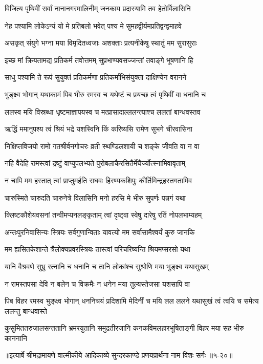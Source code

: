 \twolineshloka
{विजित्य पृथिवीं सर्वां नानानगरमालिनीम्}
{जनकाय प्रदास्यामि तव हेतोर्विलासिनि} %

\twolineshloka
{नेह पश्यामि लोकेऽन्यं यो मे प्रतिबलो भवेत्}
{पश्य मे सुमहद्वीर्यमप्रतिद्वन्द्वमाहवे} %

\twolineshloka
{असकृत् संयुगे भग्ना मया विमृदितध्वजाः}
{अशक्ताः प्रत्यनीकेषु स्थातुं मम सुरासुराः} %

\twolineshloka
{इच्छ मां क्रियतामद्य प्रतिकर्म तवोत्तमम्}
{सुप्रभाण्यवसज्जन्तां तवाङ्गे भूषणानि हि} %

\twolineshloka
{साधु पश्यामि ते रूपं सुयुक्तं प्रतिकर्मणा}
{प्रतिकर्माभिसंयुक्ता दाक्षिण्येन वरानने} %

\twolineshloka
{भुङ्क्ष्व भोगान् यथाकामं पिब भीरु रमस्व च}
{यथेष्टं च प्रयच्छ त्वं पृथिवीं वा धनानि च} %

\twolineshloka
{ललस्व मयि विस्रब्धा धृष्टमाज्ञापयस्व च}
{मत्प्रासादाल्ललन्त्याश्च ललतां बान्धवस्तव} %

\twolineshloka
{ऋद्धिं ममानुपश्य त्वं श्रियं भद्रे यशस्विनि}
{किं करिष्यसि रामेण सुभगे चीरवासिना} %

\twolineshloka
{निक्षिप्तविजयो रामो गतश्रीर्वनगोचरः}
{व्रती स्थण्डिलशायी च शङ्के जीवति वा न वा} %

\twolineshloka
{नहि वैदेहि रामस्त्वां द्रष्टुं वाप्युपलभ्यते}
{पुरोबलाकैरसितैर्मेघैर्ज्योत्स्नामिवावृताम्} %

\twolineshloka
{न चापि मम हस्तात् त्वां प्राप्तुमर्हति राघवः}
{हिरण्यकशिपुः कीर्तिमिन्द्रहस्तगतामिव} %

\twolineshloka
{चारुस्मिते चारुदति चारुनेत्रे विलासिनि}
{मनो हरसि मे भीरु सुपर्णः पन्नगं यथा} %

\twolineshloka
{क्लिष्टकौशेयवसनां तन्वीमप्यनलङ्कृताम्}
{त्वां दृष्ट्वा स्वेषु दारेषु रतिं नोपलभाम्यहम्} %

\twolineshloka
{अन्तःपुरनिवासिन्यः स्त्रियः सर्वगुणान्विताः}
{यावत्यो मम सर्वासामैश्वर्यं कुरु जानकि} %

\twolineshloka
{मम ह्यसितकेशान्ते त्रैलोक्यप्रवरस्त्रियः}
{तास्त्वां परिचरिष्यन्ति श्रियमप्सरसो यथा} %

\twolineshloka
{यानि वैश्रवणे सुभ्रु रत्नानि च धनानि च}
{तानि लोकांश्च सुश्रोणि मया भुङ्क्ष्व यथासुखम्} %

\twolineshloka
{न रामस्तपसा देवि न बलेन च विक्रमैः}
{न धनेन मया तुल्यस्तेजसा यशसापि वा} %

\twolineshloka
{पिब विहर रमस्व भुङ्क्ष्व भोगान् धननिचयं प्रदिशामि मेदिनीं च}
{मयि लल ललने यथासुखं त्वं त्वयि च समेत्य ललन्तु बान्धवास्ते} %

\twolineshloka
{कुसुमिततरुजालसन्ततानि भ्रमरयुतानि समुद्रतीरजानि}
{कनकविमलहारभूषिताङ्गी विहर मया सह भीरु काननानि} %


॥इत्यार्षे श्रीमद्रामायणे वाल्मीकीये आदिकाव्ये सुन्दरकाण्डे प्रणयप्रार्थना नाम विंशः सर्गः ॥५-२०॥
